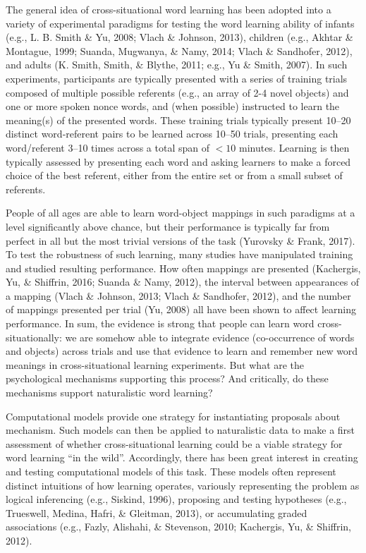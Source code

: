 \documentclass[10pt, letterpaper]{article}
\begin{document}
The general idea of cross-situational word learning has been adopted
into a variety of experimental paradigms for testing the word learning
ability of infants (e.g., L. B. Smith \& Yu, 2008; Vlach \& Johnson,
2013), children (e.g., Akhtar \& Montague, 1999; Suanda, Mugwanya, \&
Namy, 2014; Vlach \& Sandhofer, 2012), and adults (K. Smith, Smith, \&
Blythe, 2011; e.g., Yu \& Smith, 2007). In such experiments,
participants are typically presented with a series of training trials
composed of multiple possible referents (e.g., an array of 2-4 novel
objects) and one or more spoken nonce words, and (when possible)
instructed to learn the meaning(s) of the presented words. These
training trials typically present 10--20 distinct word-referent pairs to
be learned across 10--50 trials, presenting each word/referent 3--10
times across a total span of \(<10\) minutes. Learning is then typically
assessed by presenting each word and asking learners to make a forced
choice of the best referent, either from the entire set or from a small
subset of referents.

People of all ages are able to learn word-object mappings in such
paradigms at a level significantly above chance, but their performance
is typically far from perfect in all but the most trivial versions of
the task (Yurovsky \& Frank, 2017). To test the robustness of such
learning, many studies have manipulated training and studied resulting
performance. How often mappings are presented (Kachergis, Yu, \&
Shiffrin, 2016; Suanda \& Namy, 2012), the interval between appearances
of a mapping (Vlach \& Johnson, 2013; Vlach \& Sandhofer, 2012), and the
number of mappings presented per trial (Yu, 2008) all have been shown to
affect learning performance. In sum, the evidence is strong that people
can learn word cross-situationally: we are somehow able to integrate
evidence (co-occurrence of words and objects) across trials and use that
evidence to learn and remember new word meanings in cross-situational
learning experiments. But what are the psychological mechanisms
supporting this process? And critically, do these mechanisms support
naturalistic word learning?

Computational models provide one strategy for instantiating proposals
about mechanism. Such models can then be applied to naturalistic data to
make a first assessment of whether cross-situational learning could be a
viable strategy for word learning ``in the wild''. Accordingly, there
has been great interest in creating and testing computational models of
this task. These models often represent distinct intuitions of how
learning operates, variously representing the problem as logical
inferencing (e.g., Siskind, 1996), proposing and testing hypotheses
(e.g., Trueswell, Medina, Hafri, \& Gleitman, 2013), or accumulating
graded associations (e.g., Fazly, Alishahi, \& Stevenson, 2010;
Kachergis, Yu, \& Shiffrin, 2012).
\end{document}
